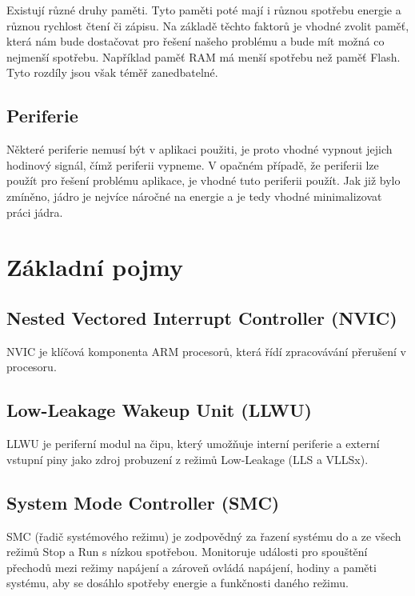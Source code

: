 \documentclass{article}
\begin{document}
Existují různé druhy paměti. Tyto paměti poté mají i různou spotřebu energie a
různou rychlost čtení či zápisu. Na základě těchto faktorů je vhodné zvolit
paměť, která nám bude dostačovat pro řešení našeho problému a bude mít možná co
nejmenší spotřebu. Například paměť RAM má menší spotřebu než paměť Flash. Tyto
rozdíly jsou však téměř zanedbatelné.

\subsection{Periferie}

Některé periferie nemusí být v aplikaci použiti, je proto vhodné vypnout jejich
hodinový signál, čímž periferii vypneme. V opačném případě, že periferii lze
použít pro řešení problému aplikace, je vhodné tuto periferii použít. Jak již
bylo zmíněno, jádro je nejvíce náročné na energie a je tedy vhodné
minimalizovat práci jádra.

\section{Základní pojmy}

\subsection{Nested Vectored Interrupt Controller (NVIC)}

NVIC je klíčová komponenta ARM procesorů, která řídí zpracovávání přerušení
v procesoru.

\subsection{Low-Leakage Wakeup Unit (LLWU)}

LLWU je periferní modul na čipu, který umožňuje interní periferie a externí
vstupní piny jako zdroj probuzení z režimů Low-Leakage (LLS a VLLSx).

\subsection{System Mode Controller (SMC)}

SMC (řadič systémového režimu) je zodpovědný za řazení systému do a ze všech
režimů Stop a Run s nízkou spotřebou. Monitoruje události pro spouštění
přechodů mezi režimy napájení a zároveň ovládá napájení, hodiny a paměti
systému, aby se dosáhlo spotřeby energie a funkčnosti daného režimu.
\end{document}

